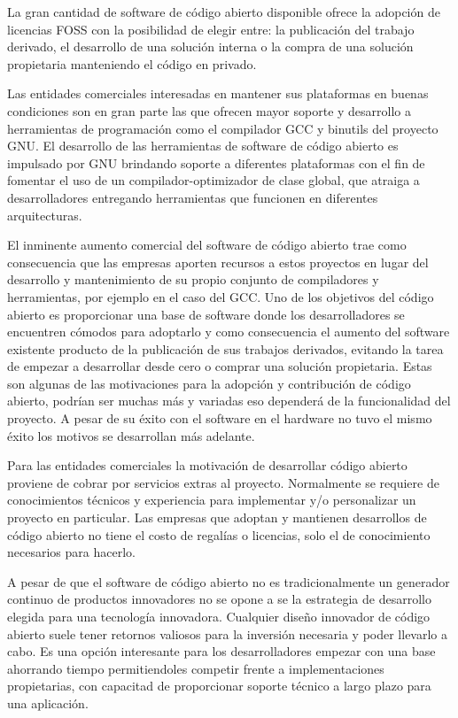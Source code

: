 La gran cantidad de software de código abierto disponible ofrece la adopción de licencias FOSS con la posibilidad de elegir entre: la publicación del trabajo derivado, el desarrollo de una solución interna o la compra de una solución propietaria manteniendo el código en privado.

 Las entidades comerciales interesadas en mantener sus plataformas en buenas condiciones son en gran parte las que ofrecen mayor soporte y desarrollo a herramientas de programación como el compilador GCC y binutils del proyecto GNU. El desarrollo de las herramientas de software de código abierto es impulsado por GNU brindando soporte a diferentes plataformas con el fin de fomentar el uso de un compilador-optimizador de clase global, que atraiga a desarrolladores entregando herramientas que funcionen en diferentes arquitecturas. 

El inminente aumento comercial del software de código abierto trae como consecuencia que las empresas aporten recursos a estos proyectos en lugar del desarrollo y 			mantenimiento de su propio conjunto de compiladores y herramientas, por ejemplo en el caso del GCC. Uno de los objetivos del código abierto es proporcionar una base de software donde los desarrolladores se encuentren cómodos para adoptarlo y como consecuencia el aumento del software existente producto de la publicación de sus trabajos derivados, evitando la tarea de empezar a desarrollar desde cero o comprar una solución propietaria. Estas son algunas de las motivaciones para la adopción y contribución de código abierto, podrían ser muchas más y variadas eso dependerá de la funcionalidad del proyecto. A pesar de su éxito con el software en el hardware no tuvo el mismo éxito los motivos se desarrollan más adelante.


Para las entidades comerciales la motivación de desarrollar código abierto proviene de cobrar por servicios extras al proyecto. Normalmente se requiere de conocimientos técnicos y experiencia para implementar y/o personalizar un proyecto en particular. Las empresas que adoptan y mantienen desarrollos de código abierto no tiene el costo de regalías o licencias, solo el de conocimiento necesarios para hacerlo.  

A pesar de que el software de código abierto no es tradicionalmente un generador continuo de productos innovadores no se opone a se la estrategia de desarrollo elegida para una tecnología innovadora. Cualquier diseño innovador de código abierto suele tener retornos valiosos para la inversión necesaria y poder llevarlo a cabo. Es una opción interesante para los desarrolladores empezar con una base ahorrando tiempo  permitiendoles competir frente a  implementaciones propietarias, con capacitad de proporcionar soporte técnico a largo plazo para una aplicación. 

